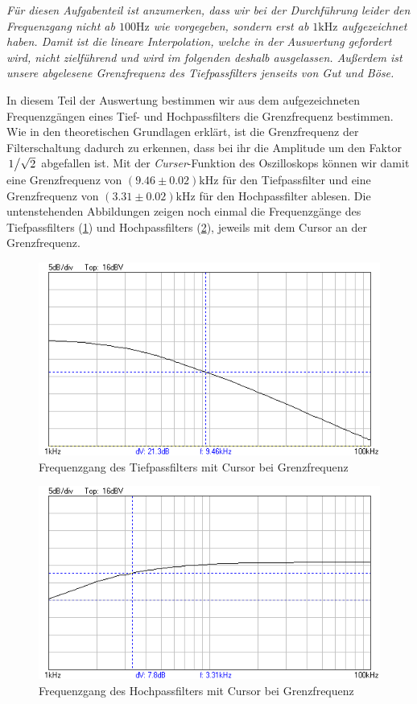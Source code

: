 \small \textit{Für diesen Aufgabenteil ist anzumerken, dass wir bei der Durchführung leider den Frequenzgang nicht ab $100\si{\hertz}$ wie vorgegeben, sondern erst ab $1\si{\kilo\hertz}$ aufgezeichnet haben. Damit ist die lineare Interpolation, welche in der Auswertung gefordert wird, nicht zielführend und wird im folgenden deshalb ausgelassen. Außerdem ist unsere abgelesene Grenzfrequenz des Tiefpassfilters jenseits von Gut und Böse.}
\normalsize

In diesem Teil der Auswertung bestimmen wir aus dem aufgezeichneten Frequenzgängen eines Tief- und Hochpassfilters die Grenzfrequenz bestimmen. Wie in den theoretischen Grundlagen erklärt, ist die Grenzfrequenz der Filterschaltung dadurch zu erkennen, dass bei ihr die Amplitude um den Faktor $\flatfrac{1}{\sqrt{2}}$ abgefallen ist. Mit der \textit{Curser}-Funktion des Oszilloskops können wir damit eine Grenzfrequenz von $(9.46 \pm 0.02)\si{\kilo\hertz}$ für den Tiefpassfilter und eine Grenzfrequenz von $(3.31 \pm 0.02) \si{\kilo\hertz}$ für den Hochpassfilter ablesen. Die untenstehenden Abbildungen zeigen noch einmal die Frequenzgänge des Tiefpassfilters (\ref{fig:aufgabe3_tiefpass}) und Hochpassfilters (\ref{fig:aufgabe3_hochpass}), jeweils mit dem Cursor an der Grenzfrequenz.


\begin{figure}[H]
  \centering
  \includegraphics[width=.8\textwidth]{files/aufgabe3_tiefpass.png}
  \caption{Frequenzgang des Tiefpassfilters mit Cursor bei Grenzfrequenz}
  \label{fig:aufgabe3_tiefpass}
\end{figure}

\begin{figure}[H]
  \centering
  \includegraphics[width=.8\textwidth]{files/aufgabe3_hochpass.png}
  \caption{Frequenzgang des Hochpassfilters mit Cursor bei Grenzfrequenz}
  \label{fig:aufgabe3_hochpass}
\end{figure}

